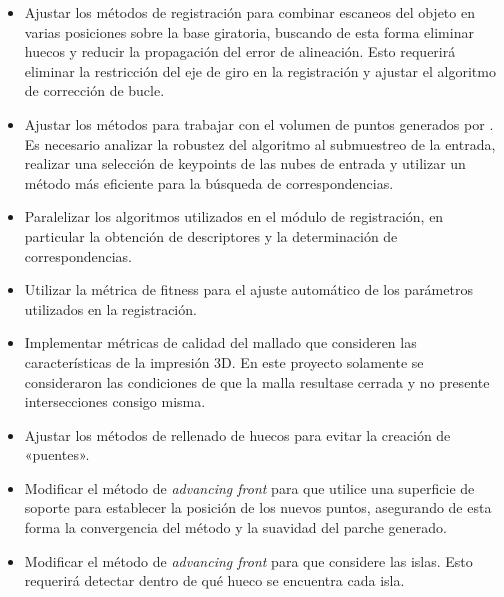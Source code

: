 \begin{itemize}
	\item Ajustar los métodos de registración para combinar escaneos del objeto
		en varias posiciones sobre la base giratoria,
		buscando de esta forma eliminar huecos y reducir la propagación del error de alineación.
		Esto requerirá eliminar la restricción del eje de giro en la registración
		y ajustar el algoritmo de corrección de bucle.
	\item Ajustar los métodos para trabajar con el volumen de puntos generados
		por \cite{Pancho}.
		Es necesario analizar la robustez del algoritmo al submuestreo de la entrada,
		realizar una selección de keypoints de las nubes de entrada
		y utilizar un método más eficiente para la búsqueda de correspondencias.
	\item Paralelizar los algoritmos utilizados en el módulo de registración,
		en particular la obtención de descriptores y la determinación de correspondencias.
	\item Utilizar la métrica de fitness para el ajuste automático de los parámetros utilizados en la registración.
	\item Implementar métricas de calidad del mallado que consideren las
		características de la impresión 3D.
		En este proyecto solamente se consideraron las condiciones de que la malla
		resultase cerrada y no presente intersecciones consigo misma.
	\item Ajustar los métodos de rellenado de huecos para evitar la creación de «puentes».
	\item Modificar el método de \emph{advancing front} para que utilice una
		superficie de soporte para establecer la posición de los nuevos puntos,
		asegurando de esta forma la convergencia del método y la suavidad del
		parche generado.
	\item Modificar el método de \emph{advancing front} para que considere las islas.
		Esto requerirá detectar dentro de qué hueco se encuentra cada isla.
\end{itemize}
